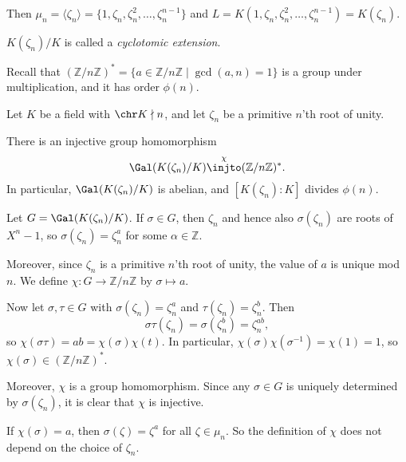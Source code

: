 \documentclass[12pt]{article}
\begin{document}
Then $\mu_n = \langle \zeta_n \rangle = \{1, \zeta_n, \zeta_n^2, \ldots, \zeta_n^{n-1}\}$ and $L = K(1, \zeta_n, \zeta_n^2, \ldots, \zeta_n^{n-1}) = K(\zeta_n)$.

\begin{definition}
	$K(\zeta_n)/K$ is called a \emph{cyclotomic extension}.
\end{definition}


Recall that $(\mathbb{Z}/n \mathbb{Z})^{\ast} = \{a \in \mathbb{Z}/n \mathbb{Z} \mid \gcd(a, n) = 1\}$ is a group under multiplication, and it has order $\phi(n)$.

Let $K$ be a field with $\chr K \nmid n$, and let $\zeta_n$ be a primitive $n$'th root of unity.
\begin{theorem}
	There is an injective group homomorphism
	\[
		\Gal(K(\zeta_n)/K) \overset{\chi}{\injto} (\mathbb{Z}/n \mathbb{Z})^{\ast}.
	\]
	In particular, $\Gal(K(\zeta_n)/K)$ is abelian, and $[K(\zeta_n):K]$ divides $\phi(n)$.
\end{theorem}

\begin{proofbox}
	Let $G = \Gal(K(\zeta_n)/K)$. If $\sigma \in G$, then $\zeta_n$ and hence also $\sigma(\zeta_n)$ are roots of $X^n - 1$, so $\sigma(\zeta_n) = \zeta_n^a$ for some $\alpha \in \mathbb{Z}$.

	Moreover, since $\zeta_n$ is a primitive $n$'th root of unity, the value of $a$ is unique mod $n$. We define $\chi : G \to \mathbb{Z}/n \mathbb{Z}$ by $\sigma \mapsto a$.

	Now let $\sigma, \tau \in G$ with $\sigma(\zeta_n) = \zeta_n^a$ and $\tau(\zeta_n) = \zeta_n^b$. Then
	\[
	\sigma \tau(\zeta_n) = \sigma(\zeta_n^b) = \zeta_n^{ab},
	\]
	so $\chi(\sigma \tau) = ab = \chi(\sigma) \chi(t)$. In particular, $\chi(\sigma) \chi(\sigma^{-1}) = \chi(1) = 1$, so $\chi(\sigma) \in (\mathbb{Z}/n \mathbb{Z})^{\ast}$.

	Moreover, $\chi$ is a group homomorphism. Since any $\sigma \in G$ is uniquely determined by $\sigma(\zeta_n)$, it is clear that $\chi$ is injective.
\end{proofbox}

\begin{remark}
	If $\chi(\sigma) = a$, then $\sigma(\zeta) = \zeta^a$ for all $\zeta \in \mu_n$. So the definition of $\chi$ does not depend on the choice of $\zeta_n$.
\end{remark}
\end{document}
